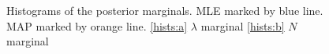 \documentclass{ieeeaccess}
\theoremstyle{definition}
\begin{document}
\begin{figure}[H]
  \centering
  \centering
  \centering
  \caption{Histograms of the posterior marginals. MLE marked by blue line. MAP marked by orange line. \ref{hists:a} $\lambda$ marginal \ref{hists:b} $N$ marginal}
  \label{fig:hists}
\end{figure}
\end{document}
